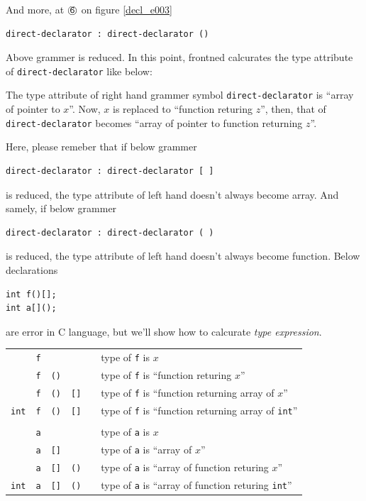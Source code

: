 And more, at ${\MARU{\tt 6}}$ on figure \ref{decl_e003}
\begin{verbatim}
direct-declarator : direct-declarator ()
\end{verbatim}
Above grammer is reduced. In this point, frontned calcurates
the type attribute of {\tt{direct-declarator}} like below:

The type attribute of right hand grammer symbol {\tt{direct-declarator}}
is ``array of pointer to $x$''.
Now, $x$ is replaced to ``function returing $z$'',
then, that of {\tt{direct-declarator}} becomes
``array of pointer to function returning $z$''.

Here, please remeber that if below grammer
\begin{verbatim}
direct-declarator : direct-declarator [ ]
\end{verbatim}
is reduced, the type attribute of left hand doesn't always become
array. And samely, if below grammer
\begin{verbatim}
direct-declarator : direct-declarator ( )
\end{verbatim}
is reduced, the type attribute of left hand doesn't always become
function.
Below declarations
\begin{verbatim}
int f()[];
int a[]();
\end{verbatim}
are error in C language, but we'll show how to calcurate
{\em type expression}. 

\begin{tabular}{cccccl}
           & {\tt{f}} &           &           &    &
                 type of {\tt{f}} is $x$                       \\
           & {\tt{f}} & {\tt{()}} &           &    &
                 type of {\tt{f}} is ``function returing $x$'' \\
           & {\tt{f}} & {\tt{()}} & {\tt{[]}} &    &
                 type of {\tt{f}} is ``function returning array of $x$'' \\
{\tt{int}} & {\tt{f}} & {\tt{()}} & {\tt{[]}} &    &
            type of {\tt{f}} is ``function returning array of {\tt{int}}'' \\
           &          &           &           &    &
                                                         \\
           & {\tt{a}} &           &           &    &
                 type of {\tt{a}} is $x$                       \\
           & {\tt{a}} & {\tt{[]}} &           &    &
                 type of {\tt{a}} is ``array of $x$'' \\
           & {\tt{a}} & {\tt{[]}} & {\tt{()}} &    &
            type of {\tt{a}} is ``array of function returing $x$'' \\
{\tt{int}} & {\tt{a}} & {\tt{[]}} & {\tt{()}} &    &
            type of {\tt{a}} is ``array of function returing {\tt{int}}'' \\
\end{tabular}

